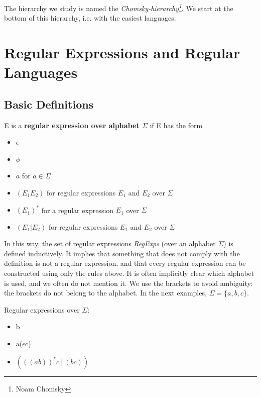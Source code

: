 The hierarchy we study is named the {\em
Chomsky-hierarchy\footnote{Noam Chomsky}}. We start at the bottom of
this hierarchy, i.e. with the easiest languages.



\chapter{Regular Expressions and Regular Languages}

\section{Basic Definitions}

\begin{definition} \label{defregexp}
E is a {\bf regular expression over alphabet $\Sigma$} if E has the form
\begin{itemize}
\item $\epsilon$
\item $\phi$
\item $a$ for $a \in \Sigma$
\item $(E_1E_2)$ for regular expressions $E_1$ and $E_2$ over $\Sigma$
\item $(E_1)^*$ for a regular expression $E_1$ over $\Sigma$
\item $(E_1 | E_2)$ for regular expressions $E_1$ and $E_2$ over $\Sigma$
\end{itemize}
\end{definition}

In this way, the set of regular expressions {\em RegExps} (over an
alphabet $\Sigma$) is defined inductively. It implies that something
that does not comply with the definition is not a regular expression,
and that every regular expression can be constructed using only the
rules above.
%
It is often implicitly clear which alphabet is used, and we often do
not mention it.
%
We use the brackets to avoid ambiguity: the brackets do not belong to
the alphabet.
%
In the next examples, $\Sigma = \{a,b,c\}$.

\begin{example}
Regular expressions over $\Sigma$:
\begin{itemize}
\item b
\item a($\epsilon$c)
\item $(((ab))^*c~|~(bc))$
\end{itemize}
\end{example}

